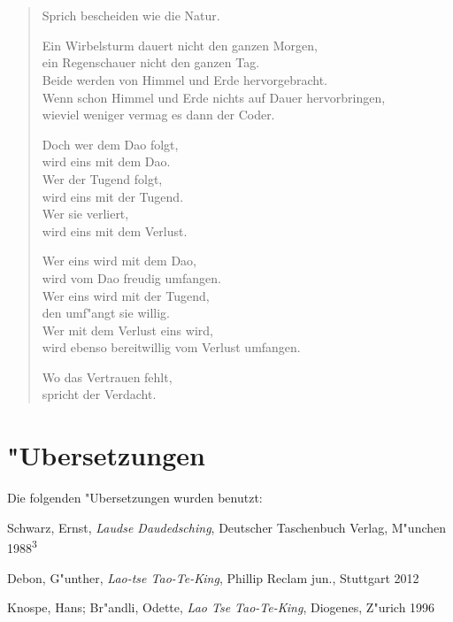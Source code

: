 \documentclass[a4paper,10pt,openany]{book}
\begin{document}
\chapter{}
\begin{verse}
    Sprich bescheiden wie die Natur.

    Ein Wirbelsturm dauert nicht den ganzen Morgen,\\
    ein Regenschauer nicht den ganzen Tag.\\
    Beide werden von Himmel und Erde hervorgebracht.\\
    Wenn schon Himmel und Erde nichts auf Dauer hervorbringen,\\
    wieviel weniger vermag es dann der Coder.

    Doch wer dem Dao folgt,\\
    wird eins mit dem Dao.\\
    Wer der Tugend folgt,\\
    wird eins mit der Tugend.\\
    Wer sie verliert,\\
    wird eins mit dem Verlust.

    Wer eins wird mit dem Dao,\\
    wird vom Dao freudig umfangen.\\
    Wer eins wird mit der Tugend,\\
    den umf"angt sie willig.\\
    Wer mit dem Verlust eins wird,\\
    wird ebenso bereitwillig vom Verlust umfangen.

    Wo das Vertrauen fehlt,\\
    spricht der Verdacht.
\end{verse}



\appendix
\chapter{"Ubersetzungen}

Die folgenden "Ubersetzungen wurden benutzt:

\begin{description}
\item Schwarz, Ernst, \textit{Laudse Daudedsching}, Deutscher Taschenbuch Verlag, M"unchen 1988\textsuperscript{3}
\item Debon, G"unther, \textit{Lao-tse Tao-Te-King}, Phillip Reclam jun., Stuttgart 2012
\item Knospe, Hans; Br"andli, Odette, \textit{Lao Tse Tao-Te-King}, Diogenes, Z"urich 1996
\end{description}
\end{document}
